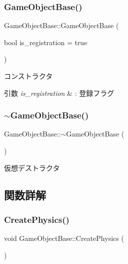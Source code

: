 \subsubsection{\texorpdfstring{Game\+Object\+Base()}{GameObjectBase()}}
{\footnotesize\ttfamily Game\+Object\+Base\+::\+Game\+Object\+Base (\begin{DoxyParamCaption}\item[{bool}]{is\+\_\+registration = {\ttfamily true} }\end{DoxyParamCaption})}



コンストラクタ 


\begin{DoxyParams}{引数}
{\em is\+\_\+registration} & \+: 登録フラグ \\
\hline
\end{DoxyParams}
\mbox{\label{class_game_object_base_a0cb813d5c7af673a3d190eb1b2d26275}} 
\subsubsection{\texorpdfstring{$\sim$\+Game\+Object\+Base()}{~GameObjectBase()}}
{\footnotesize\ttfamily Game\+Object\+Base\+::$\sim$\+Game\+Object\+Base (\begin{DoxyParamCaption}{ }\end{DoxyParamCaption})\hspace{0.3cm}{\ttfamily [virtual]}}



仮想デストラクタ 



\subsection{関数詳解}
\mbox{\label{class_game_object_base_adf7df49baa04363c63f9515317776e40}} 
\subsubsection{\texorpdfstring{Create\+Physics()}{CreatePhysics()}}
{\footnotesize\ttfamily void Game\+Object\+Base\+::\+Create\+Physics (\begin{DoxyParamCaption}{ }\end{DoxyParamCaption})}



